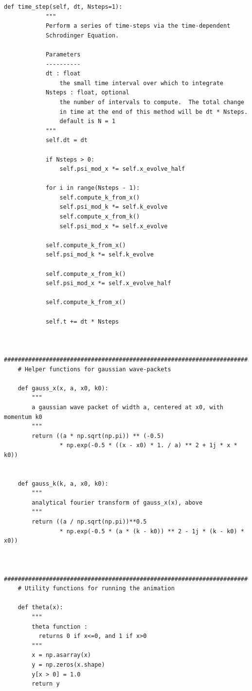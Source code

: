 \documentclass[UTF8,ctexart,a4paper,11pt,openany]{article}
\theoremstyle{definition}
\begin{document}
\begin{lstlisting}[aboveskip=0pt]
        def time_step(self, dt, Nsteps=1):
            """
            Perform a series of time-steps via the time-dependent
            Schrodinger Equation.
    
            Parameters
            ----------
            dt : float
                the small time interval over which to integrate
            Nsteps : float, optional
                the number of intervals to compute.  The total change
                in time at the end of this method will be dt * Nsteps.
                default is N = 1
            """
            self.dt = dt
    
            if Nsteps > 0:
                self.psi_mod_x *= self.x_evolve_half
    
            for i in range(Nsteps - 1):
                self.compute_k_from_x()
                self.psi_mod_k *= self.k_evolve
                self.compute_x_from_k()
                self.psi_mod_x *= self.x_evolve
    
            self.compute_k_from_x()
            self.psi_mod_k *= self.k_evolve
    
            self.compute_x_from_k()
            self.psi_mod_x *= self.x_evolve_half
    
            self.compute_k_from_x()
    
            self.t += dt * Nsteps
    
    
    ######################################################################
    # Helper functions for gaussian wave-packets
    
    def gauss_x(x, a, x0, k0):
        """
        a gaussian wave packet of width a, centered at x0, with momentum k0
        """
        return ((a * np.sqrt(np.pi)) ** (-0.5)
                * np.exp(-0.5 * ((x - x0) * 1. / a) ** 2 + 1j * x * k0))
    
    
    def gauss_k(k, a, x0, k0):
        """
        analytical fourier transform of gauss_x(x), above
        """
        return ((a / np.sqrt(np.pi))**0.5
                * np.exp(-0.5 * (a * (k - k0)) ** 2 - 1j * (k - k0) * x0))
    
    
    ######################################################################
    # Utility functions for running the animation
    
    def theta(x):
        """
        theta function :
          returns 0 if x<=0, and 1 if x>0
        """
        x = np.asarray(x)
        y = np.zeros(x.shape)
        y[x > 0] = 1.0
        return y
    

\end{lstlisting}
\end{document}
